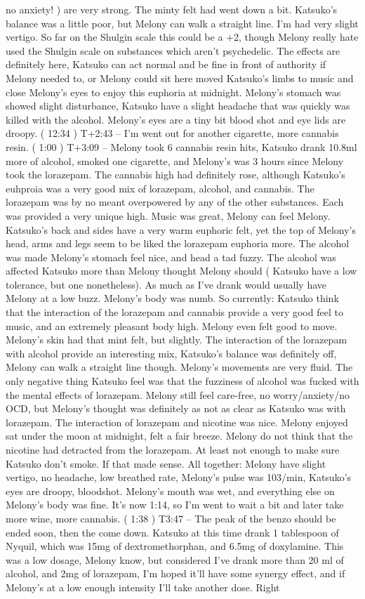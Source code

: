 \documentclass[12pt]{book}
\begin{document}
no anxiety! ) are very strong. The minty felt had went down a bit. Katsuko's balance was a little poor, but Melony can walk a straight line. I'm had very slight vertigo. So far on the Shulgin scale this could be a +2, though Melony really hate used the Shulgin scale on substances which aren't psychedelic. The effects are definitely here, Katsuko can act normal and be fine in front of authority if Melony needed to, or Melony could sit here moved Katsuko's limbs to music and close Melony's eyes to enjoy this euphoria at midnight. Melony's stomach was showed slight disturbance, Katsuko have a slight headache that was quickly was killed with the alcohol. Melony's eyes are a tiny bit blood shot and eye lids are droopy. ( 12:34 ) T+2:43 -- I'm went out for another cigarette, more cannabis resin. ( 1:00 ) T+3:09 -- Melony took 6 cannabis resin hits, Katsuko drank 10.8ml more of alcohol, smoked one cigarette, and Melony's was 3 hours since Melony took the lorazepam. The cannabis high had definitely rose, although Katsuko's euhproia was a very good mix of lorazepam, alcohol, and cannabis. The lorazepam was by no meant overpowered by any of the other substances. Each was provided a very unique high. Music was great, Melony can feel Melony. Katsuko's back and sides have a very warm euphoric felt, yet the top of Melony's head, arms and legs seem to be liked the lorazepam euphoria more. The alcohol was made Melony's stomach feel nice, and head a tad fuzzy. The alcohol was affected Katsuko more than Melony thought Melony should ( Katsuko have a low tolerance, but one nonetheless). As much as I've drank would usually have Melony at a low buzz. Melony's body was numb. So currently: Katsuko think that the interaction of the lorazepam and cannabis provide a very good feel to music, and an extremely pleasant body high. Melony even felt good to move. Melony's skin had that mint felt, but slightly. The interaction of the lorazepam with alcohol provide an interesting mix, Katsuko's balance was definitely off, Melony can walk a straight line though. Melony's movements are very fluid. The only negative thing Katsuko feel was that the fuzziness of alcohol was fucked with the mental effects of lorazepam. Melony still feel care-free, no worry/anxiety/no OCD, but Melony's thought was definitely as not as clear as Katsuko was with lorazepam. The interaction of lorazepam and nicotine was nice. Melony enjoyed sat under the moon at midnight, felt a fair breeze. Melony do not think that the nicotine had detracted from the lorazepam. At least not enough to make sure Katsuko don't smoke. If that made sense. All together: Melony have slight vertigo, no headache, low breathed rate, Melony's pulse was 103/min, Katsuko's eyes are droopy, bloodshot. Melony's mouth was wet, and everything else on Melony's body was fine. It's now 1:14, so I'm went to wait a bit and later take more wine, more cannabis. ( 1:38 ) T3:47 -- The peak of the benzo should be ended soon, then the come down. Katsuko at this time drank 1 tablespoon of Nyquil, which was 15mg of dextromethorphan, and 6.5mg of doxylamine. This was a low dosage, Melony know, but considered I've drank more than 20 ml of alcohol, and 2mg of lorazepam, I'm hoped it'll have some synergy effect, and if Melony's at a low enough intensity I'll take another dose. Right 
\end{document}

